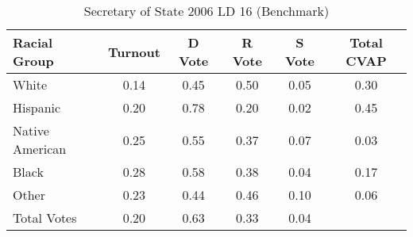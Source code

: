 \begin{table}[htb]
\begin{center}
\caption{Secretary of State 2006 LD 16 (Benchmark)}
\label{sos06_cvap_ld_16_benchmark}
\begin{tabular}{lccccc}
  \hline
Racial Group & Turnout & D Vote & R Vote & S Vote & Total CVAP \\ 
  \hline
White & 0.14 & 0.45 & 0.50 & 0.05 & 0.30 \\ 
  Hispanic & 0.20 & 0.78 & 0.20 & 0.02 & 0.45 \\ 
  Native American & 0.25 & 0.55 & 0.37 & 0.07 & 0.03 \\ 
  Black & 0.28 & 0.58 & 0.38 & 0.04 & 0.17 \\ 
  Other & 0.23 & 0.44 & 0.46 & 0.10 & 0.06 \\ 
  Total Votes & 0.20 & 0.63 & 0.33 & 0.04 &  \\ 
   \hline
\end{tabular}
\end{center}
\end{table}
